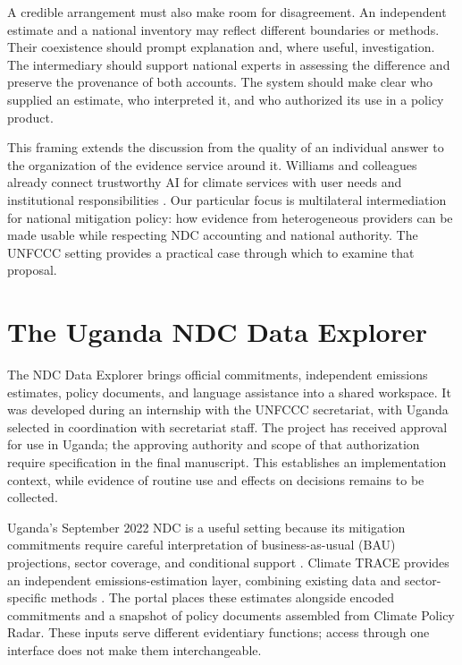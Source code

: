 \documentclass[11pt]{article}
\begin{document}
A credible arrangement must also make room for disagreement. An independent estimate and a national inventory may reflect different boundaries or methods. Their coexistence should prompt explanation and, where useful, investigation. The intermediary should support national experts in assessing the difference and preserve the provenance of both accounts. The system should make clear who supplied an estimate, who interpreted it, and who authorized its use in a policy product.

This framing extends the discussion from the quality of an individual answer to the organization of the evidence service around it. Williams and colleagues already connect trustworthy AI for climate services with user needs and institutional responsibilities \cite{williams2026}. Our particular focus is multilateral intermediation for national mitigation policy: how evidence from heterogeneous providers can be made usable while respecting NDC accounting and national authority. The UNFCCC setting provides a practical case through which to examine that proposal.

\section*{The Uganda NDC Data Explorer}

The NDC Data Explorer brings official commitments, independent emissions estimates, policy documents, and language assistance into a shared workspace. It was developed during an internship with the UNFCCC secretariat, with Uganda selected in coordination with secretariat staff. The project has received approval for use in Uganda; the approving authority and scope of that authorization require specification in the final manuscript. This establishes an implementation context, while evidence of routine use and effects on decisions remains to be collected.

Uganda's September 2022 NDC is a useful setting because its mitigation commitments require careful interpretation of business-as-usual (BAU) projections, sector coverage, and conditional support \cite{uganda2022}. Climate TRACE provides an independent emissions-estimation layer, combining existing data and sector-specific methods \cite{lancellotti2026}. The portal places these estimates alongside encoded commitments and a snapshot of policy documents assembled from Climate Policy Radar. These inputs serve different evidentiary functions; access through one interface does not make them interchangeable.
\end{document}
